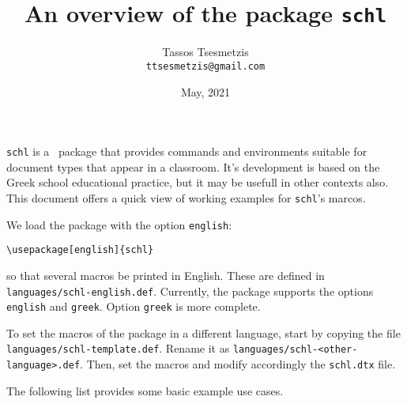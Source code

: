 \documentclass[12pt,a4page]{article}
\author{Tassos Tsesmetzis\\[-4ex] \texttt{ttsesmetzis@gmail.com}}
\title{%
  An overview of the  package \texttt{schl}%
}
\date{May, 2021}
\begin{document}
\maketitle

\verb|schl| is a \XeLaTeX\, package that provides commands and environments suitable for document types that appear in a classroom. It's development is based on the Greek school educational practice, but it may be usefull in other contexts also. This document offers a quick view of working examples for \verb|schl|'s marcos.

We load the package with the option \verb|english|:

\begin{center}
\verb|\usepackage[english]{schl}|
\end{center}

so that several macros be printed in English. These are
defined in \verb|languages/schl-english.def|. Currently, the package
supports the options \verb|english| and \verb|greek|. Option \verb|greek| is more complete.

To set the macros of the package in a different language, start by copying the file \verb|languages/schl-template.def|. Rename it as \verb|languages/schl-<other-language>.def|. Then, set the macros and modify accordingly the \verb|schl.dtx| file.

The following list provides some basic example use cases.
\end{document}
